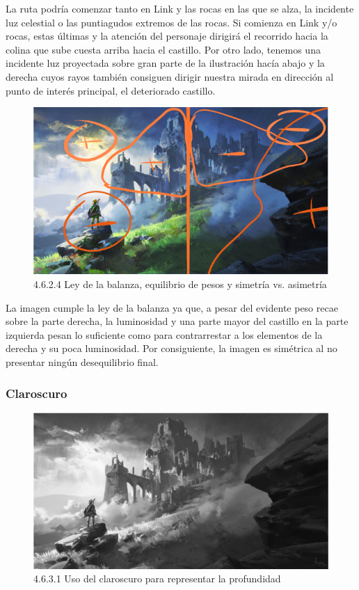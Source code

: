 \documentclass[12pt]{article}
\begin{document}
    La ruta podría comenzar tanto en Link y las rocas en las que se alza, la incidente luz celestial o las puntiagudos extremos de las rocas. Si comienza en Link y/o rocas, estas últimas y la atención del personaje dirigirá el recorrido hacia la colina que sube cuesta arriba hacia el castillo. Por otro lado, tenemos una incidente luz proyectada sobre gran parte de la ilustración hacía abajo y la derecha cuyos rayos también consiguen dirigir nuestra mirada en dirección al punto de interés principal, el deteriorado castillo.

    \begin{figure}[H]
      \centering
      \includegraphics[width=\textwidth]{images/Nerea/Nerea Zelda concept 624.PNG}
      \caption{\small 4.6.2.4 Ley de la balanza, equilibrio de pesos y simetría vs. asimetría}
    \end{figure}

    La imagen cumple la ley de la balanza ya que, a pesar del evidente peso recae sobre la parte derecha, la luminosidad y una parte mayor del castillo en la parte izquierda pesan lo suficiente como para contrarrestar a los elementos de la derecha y su poca luminosidad. Por consiguiente, la imagen es simétrica al no presentar ningún desequilibrio final.


        \subsubsection{Claroscuro}

        
    \begin{figure}[H]
      \centering
      \includegraphics[width=\textwidth]{images/Nerea/Nerea Zelda concept 631.PNG}
      \caption{\small 4.6.3.1 Uso del claroscuro para representar la profundidad}
    \end{figure}
\end{document}
